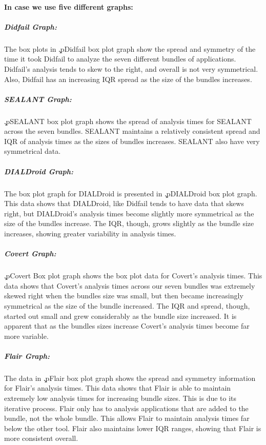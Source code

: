 \documentclass[twocolumn]{article}
\begin{document}
		\paragraph{In case we use five different graphs:}
		\subparagraph{Didfail Graph:} 
		The box plots in \c.p{Didfail box plot graph} show the spread and symmetry of the time it took Didfail to analyze the seven different bundles of applications. Didfail's analysis tends to skew to the right, and overall is not very symmetrical. Also, Didfail has an increasing IQR spread as the size of the bundles increases.
		\subparagraph{SEALANT Graph:}
		\c.p{SEALANT box plot graph} shows the spread of analysis times for SEALANT across the seven bundles. SEALANT maintains a relatively consistent spread and IQR of analysis times as the sizes of bundles increases. SEALANT also have very symmetrical data.
		\subparagraph{DIALDroid Graph:}
		The box plot graph for DIALDroid is presented in \c.p{DIALDroid box plot graph}. This data shows that DIALDroid, like Didfail tends to have data that skews right, but DIALDroid's analysis times become slightly more symmetrical as the size of the bundles increase. The IQR, though, grows slightly as the bundle size increases, showing greater variability in analysis times.
		\subparagraph{Covert Graph:}
		\c.p{Covert Box plot graph} shows the box plot data for Covert's analysis times. This data shows that Covert's analysis times across our seven bundles was extremely skewed right when the bundles size was small, but then became increasingly symmetrical as the size of the bundle increased. The IQR and spread, though, started out small and grew considerably as the bundle size increased. It is apparent that as the bundles sizes increase Covert's analysis times become far more variable.
		\subparagraph{Flair Graph:}
		The data in \c.p{Flair box plot graph} shows the spread and symmetry information for Flair's analysis times. This data shows that Flair is able to maintain extremely low analysis times for increasing bundle sizes. This is due to its iterative process. Flair only has to analysis applications that are added to the bundle, not the whole bundle. This allows Flair to maintain analysis times far below the other tool. Flair also maintains lower IQR ranges, showing that Flair is more consistent overall.
		
\end{document}
